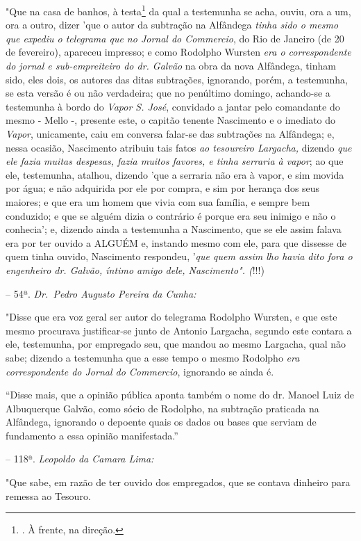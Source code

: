 "Que na casa de banhos, à testa\footnote{. À frente, na direção.} da
qual a testemunha se acha, ouviu, ora a um, ora a outro, dizer 'que o
autor da subtração na Alfândega \emph{tinha sido o mesmo que expediu o
telegrama que no Jornal do Commercio}, do Rio de Janeiro (de 20 de
fevereiro), apareceu impresso; e como Rodolpho Wursten \emph{era o
correspondente do jornal e sub-empreiteiro do dr. Galvão} na obra da
nova Alfândega, tinham sido, eles dois, os autores das ditas subtrações,
ignorando, porém, a testemunha, se esta versão é ou não verdadeira; que
no penúltimo domingo, achando-se a testemunha à bordo do \emph{Vapor S.
José}, convidado a jantar pelo comandante do mesmo - Mello -, presente
este, o capitão tenente Nascimento e o imediato do \emph{Vapor},
unicamente, caiu em conversa falar-se das subtrações na Alfândega; e,
nessa ocasião, Nascimento atribuiu tais fatos \emph{ao tesoureiro
Largacha,} dizendo \emph{que ele fazia muitas despesas, fazia muitos
favores, e tinha serraria à vapor}; ao que ele, testemunha, atalhou,
dizendo 'que a serraria não era à vapor, e sim movida por água; e não
adquirida por ele por compra, e sim por herança dos seus maiores; e que
era um homem que vivia com sua família, e sempre bem conduzido; e que se
alguém dizia o contrário é porque era seu inimigo e não o conhecia'; e,
dizendo ainda a testemunha a Nascimento, que se ele assim falava era por
ter ouvido a ALGUÉM e, instando mesmo com ele, para que dissesse de quem
tinha ouvido, Nascimento respondeu, '\emph{que quem assim lho havia dito
fora o engenheiro dr. Galvão, íntimo amigo dele, Nascimento". (}!!!)

-- 54ª. \emph{Dr.~Pedro Augusto Pereira da Cunha:}

"Disse que era voz geral ser autor do telegrama Rodolpho Wursten, e que
este mesmo procurava justificar-se junto de Antonio Largacha, segundo
este contara a ele, testemunha, por empregado seu, que mandou ao mesmo
Largacha, qual não sabe; dizendo a testemunha que a esse tempo o mesmo
Rodolpho \emph{era correspondente do Jornal do Commercio}, ignorando se
ainda é.

``Disse mais, que a opinião pública aponta também o nome do dr. Manoel
Luiz de Albuquerque Galvão, como sócio de Rodolpho, na subtração
praticada na Alfândega, ignorando o depoente quais os dados ou bases que
serviam de fundamento a essa opinião manifestada.''

-- 118ª. \emph{Leopoldo da Camara Lima:}

"Que sabe, em razão de ter ouvido dos empregados, que se contava
dinheiro para remessa ao Tesouro.

